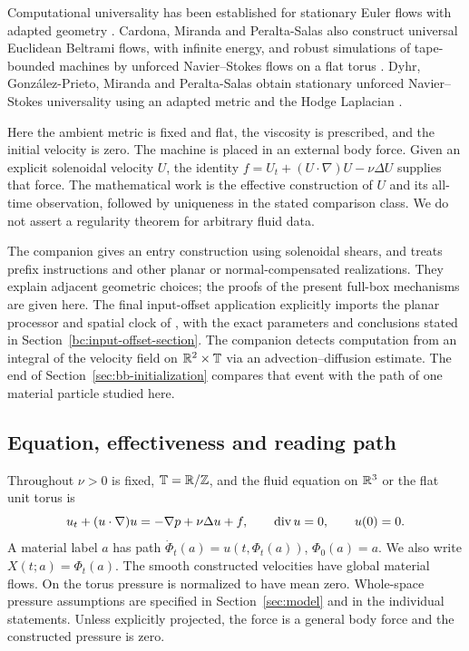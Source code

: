Computational universality has been established for stationary Euler
flows with adapted geometry \cite{CardonaMirandaPeraltaSalasPresas2021}.
Cardona, Miranda and Peralta-Salas also construct universal Euclidean
Beltrami flows, with infinite energy, and robust simulations of
tape-bounded machines by unforced Navier--Stokes flows on a flat torus
\cite[arXiv version~3, Theorem~1 and Remark~29]{CardonaMirandaPeraltaSalas2023Beltrami}.
Dyhr, Gonz\'alez-Prieto, Miranda and Peralta-Salas obtain stationary
unforced Navier--Stokes universality using an adapted metric and the
Hodge Laplacian
\cite[Theorem~A]{DyhrGonzalezPrietoMirandaPeraltaSalas2026}.

Here the ambient metric is fixed and flat, the viscosity is
prescribed, and the initial velocity is zero. The machine is placed in an
external body force. Given an explicit solenoidal velocity $U$, the identity
$f=U_t+(U\cdot\nabla)U-\nu\Delta U$ supplies that force. The mathematical
work is the effective construction of $U$ and its all-time observation,
followed by uniqueness in the stated comparison class. We do not assert a
regularity theorem for arbitrary fluid data.

The companion \cite{OpenAI379Shear} gives an entry construction using
solenoidal shears, and \cite{OpenAI379Sheets} treats prefix instructions
and other planar or normal-compensated realizations. They explain adjacent
geometric choices; the proofs of the present full-box mechanisms are given
here. The final input-offset application explicitly imports the planar
processor and spatial clock of \cite{OpenAI379StationaryA2}, with the exact
parameters and conclusions stated in Section~\ref{bc:input-offset-section}.
The companion \cite{OpenAI379EulerianC} detects computation from an
integral of the velocity field on $\mathbb R^2\times\mathbb T$ via an
advection--diffusion estimate. The end of
Section~\ref{sec:bb-initialization} compares that event with the path of
one material particle studied here.

\subsection{Equation, effectiveness and reading path}
Throughout $\nu>0$ is fixed, $\mathbb T=\mathbb R/\mathbb Z$, and the fluid equation on
$\mathbb R^3$ or the flat unit torus is
\begin{equation}\label{eq:box-NS}
 u_t+(u\cdot\nabla)u=-\nabla p+\nu\Delta u+f,
 \qquad \operatorname{div} u=0,\qquad u(0)=0.
\end{equation}
A material label $a$ has path $\dot\Phi_t(a)=u(t,\Phi_t(a))$,
$\Phi_0(a)=a$. We also write $X(t;a)=\Phi_t(a)$. The smooth constructed
velocities have global material flows. On the torus pressure is normalized
to have mean zero. Whole-space pressure assumptions are specified in
Section~\ref{sec:model} and in the individual statements. Unless explicitly
projected, the force is a general body force and the constructed pressure
is zero.

